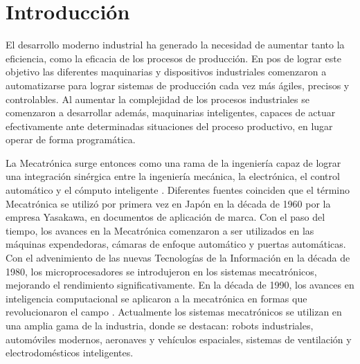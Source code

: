 \chapter{Introducción}%

\label{Chapter1} %


\newcommand{\keyword}[1]{\textbf{#1}}
\newcommand{\tabhead}[1]{\textbf{#1}}
\newcommand{\code}[1]{\texttt{#1}}
\newcommand{\file}[1]{\texttt{\bfseries#1}}
\newcommand{\option}[1]{\texttt{\itshape#1}}

   
El desarrollo moderno industrial ha generado la necesidad de aumentar tanto la eficiencia, como la eficacia de los procesos de producción. En pos de lograr este objetivo las diferentes maquinarias y dispositivos industriales comenzaron a automatizarse para lograr sistemas de producción cada vez más ágiles, precisos y controlables. Al aumentar la complejidad de los procesos industriales se comenzaron a desarrollar además, maquinarias inteligentes, capaces de actuar efectivamente ante determinadas situaciones del proceso productivo, en lugar operar de forma programática. 

La Mecatrónica surge entonces como una rama de la ingeniería capaz de lograr una integración sinérgica entre la ingeniería mecánica, la electrónica, el control  automático y el cómputo inteligente \cite{silva_mechatronics:_2010}. Diferentes fuentes coinciden que el término Mecatrónica se utilizó por primera vez en Japón en la década de 1960 por la empresa Yasakawa, en documentos de aplicación de marca. Con el paso del tiempo, los avances en la Mecatrónica comenzaron a ser utilizados en las máquinas expendedoras, cámaras de enfoque automático y puertas automáticas. Con el advenimiento de las nuevas Tecnologías de la Información en la década de 1980, los microprocesadores se introdujeron en los sistemas mecatrónicos, mejorando el rendimiento significativamente. En la década de 1990, los avances en inteligencia computacional se aplicaron a la mecatrónica en formas que revolucionaron el campo \cite{bishop_mechatronics_2002}. Actualmente los sistemas mecatrónicos se utilizan en una amplia gama de la industria, donde se destacan: robots industriales, automóviles modernos, aeronaves y vehículos espaciales, sistemas de ventilación y electrodomésticos inteligentes. 

